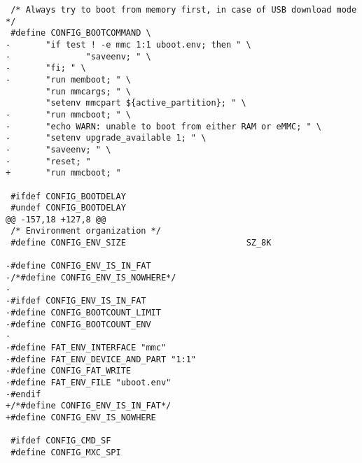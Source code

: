 \documentclass{memoir}
\begin{document}
\begin{verbatim}
 /* Always try to boot from memory first, in case of USB download mode */
 #define CONFIG_BOOTCOMMAND \
-       "if test ! -e mmc 1:1 uboot.env; then " \
-               "saveenv; " \
-       "fi; " \
-       "run memboot; " \
        "run mmcargs; " \
        "setenv mmcpart ${active_partition}; " \
-       "run mmcboot; " \
-       "echo WARN: unable to boot from either RAM or eMMC; " \
-       "setenv upgrade_available 1; " \
-       "saveenv; " \
-       "reset; "
+       "run mmcboot; "
 
 #ifdef CONFIG_BOOTDELAY
 #undef CONFIG_BOOTDELAY
@@ -157,18 +127,8 @@
 /* Environment organization */
 #define CONFIG_ENV_SIZE                        SZ_8K
 
-#define CONFIG_ENV_IS_IN_FAT
-/*#define CONFIG_ENV_IS_NOWHERE*/
-
-#ifdef CONFIG_ENV_IS_IN_FAT
-#define CONFIG_BOOTCOUNT_LIMIT
-#define CONFIG_BOOTCOUNT_ENV
-
-#define FAT_ENV_INTERFACE "mmc"
-#define FAT_ENV_DEVICE_AND_PART "1:1"
-#define CONFIG_FAT_WRITE
-#define FAT_ENV_FILE "uboot.env"
-#endif
+/*#define CONFIG_ENV_IS_IN_FAT*/
+#define CONFIG_ENV_IS_NOWHERE
 
 #ifdef CONFIG_CMD_SF
 #define CONFIG_MXC_SPI
\end{verbatim}
\end{document}
